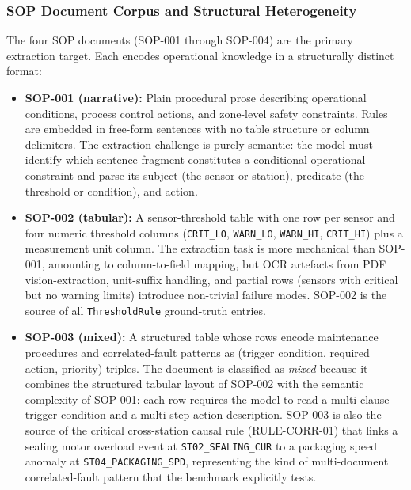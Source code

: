 ﻿\documentclass[11pt]{article}
\begin{document}
\subsubsection{SOP Document Corpus and Structural Heterogeneity}
\label{sec:sop_corpus}
The four SOP documents (SOP-001 through SOP-004) are the primary extraction target.
Each encodes operational knowledge in a structurally distinct format:

\begin{itemize}
    \item \textbf{SOP-001 (narrative):}
          Plain procedural prose describing operational conditions, process control
          actions, and zone-level safety constraints.
          Rules are embedded in free-form sentences with no table structure or
          column delimiters.
          The extraction challenge is purely semantic: the model must identify
          which sentence fragment constitutes a conditional operational constraint
          and parse its subject (the sensor or station), predicate (the threshold
          or condition), and action.

    \item \textbf{SOP-002 (tabular):}
          A sensor-threshold table with one row per sensor and four numeric threshold
          columns (\texttt{CRIT\_LO}, \texttt{WARN\_LO}, \texttt{WARN\_HI},
          \texttt{CRIT\_HI}) plus a measurement unit column.
          The extraction task is more mechanical than SOP-001, amounting to column-to-field
          mapping, but OCR artefacts from PDF vision-extraction, unit-suffix handling,
          and partial rows (sensors with critical but no warning limits) introduce
          non-trivial failure modes.
          SOP-002 is the source of all \texttt{ThresholdRule} ground-truth entries.

    \item \textbf{SOP-003 (mixed):}
          A structured table whose rows encode maintenance procedures and
          correlated-fault patterns as (trigger condition, required action, priority)
          triples.
          The document is classified as \textit{mixed} because it combines the
          structured tabular layout of SOP-002 with the semantic complexity of
          SOP-001: each row requires the model to read a multi-clause trigger
          condition and a multi-step action description.
          SOP-003 is also the source of the critical cross-station causal rule
          (RULE-CORR-01) that links a sealing motor overload event at
          \texttt{ST02\_SEALING\_CUR} to a packaging speed anomaly at
          \texttt{ST04\_PACKAGING\_SPD}, representing the kind of multi-document
          correlated-fault pattern that the benchmark explicitly tests.


\end{itemize}
\end{document}
